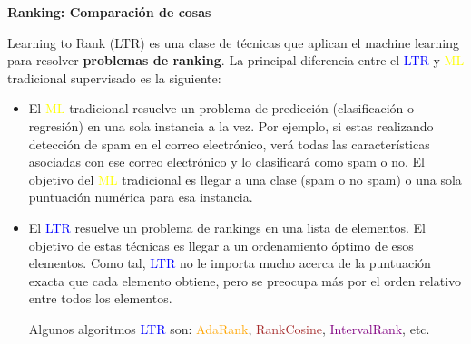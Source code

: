 \documentclass[11pt]{beamer}
\begin{document}
\begin{frame}{\textbf{\textcolor{green!55!blue}{Ranking: Comparaci\'on de cosas}}}
	

\scriptsize{ Learning to Rank  (LTR) es una clase de t\'ecnicas que aplican el machine learning  para resolver \textbf{problemas de ranking}. La principal diferencia entre el  \textcolor{blue}{LTR} y \textcolor{yellow}{ML} tradicional supervisado es la siguiente:


\begin{itemize}
\item El \textcolor{yellow}{ML} tradicional resuelve un problema de predicci\'on (clasificaci\'on o regresi\'on) en una sola instancia a la vez. Por ejemplo, si estas realizando detecci\'on de spam en el correo electr\'onico, ver\'a todas las caracter\'isticas asociadas con ese correo electr\'onico y lo clasificar\'a como spam o no. El objetivo del \textcolor{yellow}{ML} tradicional es llegar a una clase (spam o no spam) o una sola puntuaci\'on num\'erica para esa instancia.

\item El \textcolor{blue}{LTR} resuelve un problema de rankings en una lista de elementos. El objetivo de estas t\'ecnicas es llegar a un ordenamiento \'optimo de esos elementos. Como tal, \textcolor{blue}{LTR} no le importa mucho acerca de la puntuación exacta que cada elemento obtiene, pero se preocupa m\'as por el orden relativo entre todos los elementos. 

\vspace{0.2cm}

Algunos algoritmos \textcolor{blue}{LTR} son: \textcolor{orange}{AdaRank}, \textcolor{brown}{RankCosine}, \textcolor{purple}{IntervalRank}, etc.

\end{itemize}
	
}
\end{frame}
\end{document}
